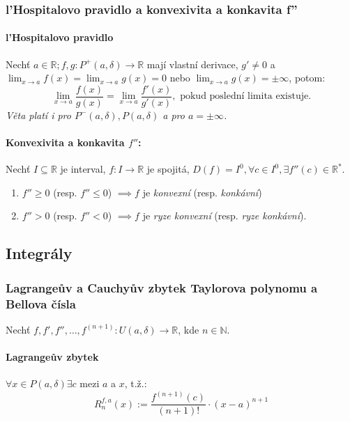 \documentclass[10pt,a4paper]{article}
\newcommand{\N}{{\mathbb{N}}}
\newcommand{\R}{{\mathbb{R}}}
\begin{document}
\subsubsection{l'Hospitalovo pravidlo a konvexivita a konkavita f''}

\paragraph*{l'Hospitalovo pravidlo} Nechť $a \in \R; f,g: P^+ (a, \delta)\to \R$ mají vlastní derivace, $g' \neq  0$ a \\
$\displaystyle \lim_{x\to a}f(x) = \lim_{x\to a}g(x) = 0$ nebo $\displaystyle \lim_{x\to a}g(x) = \pm \infty$, potom:
\[
    \lim_{x\to a}\frac {f(x)}{g(x)} = \lim_{x\to a}\frac{f'(x)}{g'(x)}, \text{ pokud poslední limita existuje.}
\] \textit{Věta platí i pro $P^-(a, \delta), P(a, \delta)$ a pro $a = \pm \infty$.}

\paragraph*{Konvexivita a konkavita $f''$:} Nechť $I\subseteq \R$ je interval, $f:I\to \R$ je spojitá, $D(f)=I^0, \forall c \in I^0, \exists f''(c)\in \R^*$.
\begin{enumerate}
    \item $f''\geq 0$ (resp. $f''\leq 0$) $\implies f$ je \textit{konvexní} (resp. \textit{konkávní})
    \item $f''> 0$ (resp. $f'' < 0$) $\implies f$ je \textit{ryze konvexní} (resp. \textit{ryze konkávní}).
\end{enumerate}

\subsection{Integrály}

\subsubsection{Lagrangeův a Cauchyův zbytek Taylorova polynomu a Bellova čísla}
 Nechť $f, f', f'', \dots, f^{(n+1)}: U(a, \delta) \to \R$, kde $n \in \N$.
 
 \paragraph*{Lagrangeův zbytek} $\forall x \in P(a, \delta) \exists c$ mezi $a$ a $x$, t.ž.: 
 \[
    R_n^{f,a}(x):=\frac{f^{(n+1)}(c)}{(n+1)!}\cdot (x-a)^{n+1}
 \]
\end{document}
